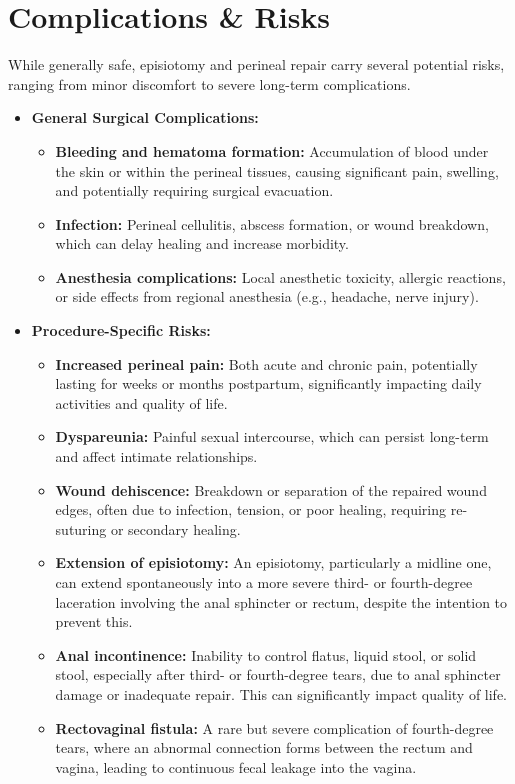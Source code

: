 \section*{Complications \& Risks}
While generally safe, episiotomy and perineal repair carry several potential risks, ranging from minor discomfort to severe long-term complications.

\begin{itemize}
  \item \textbf{General Surgical Complications:}
  \begin{itemize}
    \item \textbf{Bleeding and hematoma formation:} Accumulation of blood under the skin or within the perineal tissues, causing significant pain, swelling, and potentially requiring surgical evacuation.
    \item \textbf{Infection:} Perineal cellulitis, abscess formation, or wound breakdown, which can delay healing and increase morbidity.
    \item \textbf{Anesthesia complications:} Local anesthetic toxicity, allergic reactions, or side effects from regional anesthesia (e.g., headache, nerve injury).
  \end{itemize}
  \item \textbf{Procedure-Specific Risks:}
  \begin{itemize}
    \item \textbf{Increased perineal pain:} Both acute and chronic pain, potentially lasting for weeks or months postpartum, significantly impacting daily activities and quality of life.
    \item \textbf{Dyspareunia:} Painful sexual intercourse, which can persist long-term and affect intimate relationships.
    \item \textbf{Wound dehiscence:} Breakdown or separation of the repaired wound edges, often due to infection, tension, or poor healing, requiring re-suturing or secondary healing.
    \item \textbf{Extension of episiotomy:} An episiotomy, particularly a midline one, can extend spontaneously into a more severe third- or fourth-degree laceration involving the anal sphincter or rectum, despite the intention to prevent this.
    \item \textbf{Anal incontinence:} Inability to control flatus, liquid stool, or solid stool, especially after third- or fourth-degree tears, due to anal sphincter damage or inadequate repair. This can significantly impact quality of life.
    \item \textbf{Rectovaginal fistula:} A rare but severe complication of fourth-degree tears, where an abnormal connection forms between the rectum and vagina, leading to continuous fecal leakage into the vagina.

\end{itemize}
\end{itemize}
